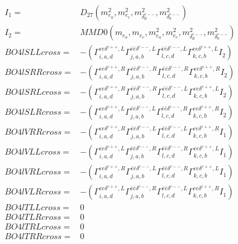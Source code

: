 \documentclass[A4,landscape]{article}
\begin{document}
\begin{align} 
I_1 = & D_{27}(m^2_{e_{{a}}}, m^2_{e_{{c}}}, m^2_{\delta^{c--}_{{d}}}, m^2_{\delta^{c--}_{{b}}}) \\ 
I_2 = & MMD0(m_{e_{{a}}}, m_{e_{{c}}}, m^2_{e_{{a}}}, m^2_{e_{{c}}}, m^2_{\delta^{c--}_{{d}}}, m^2_{\delta^{c--}_{{b}}}) \\ 
  BO4lSLLcross= & -( \Gamma^{e e \delta^{c++},L}_{i, a, d} \Gamma^{\bar{e}\bar{e}\delta^{c--} ,L}_{j, a, b} \Gamma^{\bar{e}\bar{e}\delta^{c--} ,L}_{l, c, d} \Gamma^{e e \delta^{c++},L}_{k, c, b} I_2) \\ 
  BO4lSRRcross= & -( \Gamma^{e e \delta^{c++},R}_{i, a, d} \Gamma^{\bar{e}\bar{e}\delta^{c--} ,R}_{j, a, b} \Gamma^{\bar{e}\bar{e}\delta^{c--} ,R}_{l, c, d} \Gamma^{e e \delta^{c++},R}_{k, c, b} I_2) \\ 
  BO4lSRLcross= & -( \Gamma^{e e \delta^{c++},R}_{i, a, d} \Gamma^{\bar{e}\bar{e}\delta^{c--} ,R}_{j, a, b} \Gamma^{\bar{e}\bar{e}\delta^{c--} ,L}_{l, c, d} \Gamma^{e e \delta^{c++},L}_{k, c, b} I_2) \\ 
  BO4lSLRcross= & -( \Gamma^{e e \delta^{c++},L}_{i, a, d} \Gamma^{\bar{e}\bar{e}\delta^{c--} ,L}_{j, a, b} \Gamma^{\bar{e}\bar{e}\delta^{c--} ,R}_{l, c, d} \Gamma^{e e \delta^{c++},R}_{k, c, b} I_2) \\ 
  BO4lVRRcross= & -( \Gamma^{e e \delta^{c++},R}_{i, a, d} \Gamma^{\bar{e}\bar{e}\delta^{c--} ,L}_{j, a, b} \Gamma^{\bar{e}\bar{e}\delta^{c--} ,L}_{l, c, d} \Gamma^{e e \delta^{c++},R}_{k, c, b} I_1) \\ 
  BO4lVLLcross= & -( \Gamma^{e e \delta^{c++},L}_{i, a, d} \Gamma^{\bar{e}\bar{e}\delta^{c--} ,R}_{j, a, b} \Gamma^{\bar{e}\bar{e}\delta^{c--} ,R}_{l, c, d} \Gamma^{e e \delta^{c++},L}_{k, c, b} I_1) \\ 
  BO4lVRLcross= & -( \Gamma^{e e \delta^{c++},R}_{i, a, d} \Gamma^{\bar{e}\bar{e}\delta^{c--} ,L}_{j, a, b} \Gamma^{\bar{e}\bar{e}\delta^{c--} ,R}_{l, c, d} \Gamma^{e e \delta^{c++},L}_{k, c, b} I_1) \\ 
  BO4lVLRcross= & -( \Gamma^{e e \delta^{c++},L}_{i, a, d} \Gamma^{\bar{e}\bar{e}\delta^{c--} ,R}_{j, a, b} \Gamma^{\bar{e}\bar{e}\delta^{c--} ,L}_{l, c, d} \Gamma^{e e \delta^{c++},R}_{k, c, b} I_1) \\ 
  BO4lTLLcross= & 0 \\ 
  BO4lTLRcross= & 0 \\ 
  BO4lTRLcross= & 0 \\ 
  BO4lTRRcross= & 0 \\ 
\end{align} 
\end{document}
